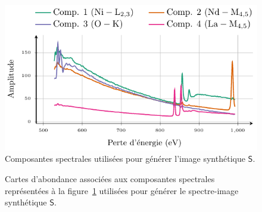 \begin{figure}[t]
    \centering
    \includegraphics{img/chapitre4/figure16/synth_spectra.pdf}
    \caption{Composantes spectrales utilisées pour générer l'image synthétique $\mathsf{S}$.
        \protect\label{fig-spectra-synth}}
\end{figure}

\begin{figure}[t]
    \centering
    \setlength\tmplength{5cm}
    \caption{Cartes d'abondance associées aux composantes spectrales représentées à la figure~\protect\ref{fig-spectra-synth} utilisées pour générer le spectre-image synthétique $\mathsf{S}$.
        \protect\label{fig-maps-synth}}
\end{figure}


